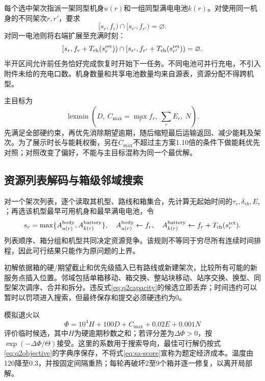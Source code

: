 \documentclass[a4paper]{my_paper}%
\numberwithin{equation}{section}
\newcommand{\lexmin}{\operatorname{lexmin}}
\theoremstyle{definition}
\begin{document}
每个选中架次指派一架同型机身$u(r)$和一组同型满电电池$k(r)$。对使用同一机身的不同架次$r,r'$，要求
\begin{equation}
 [s_r,f_r)\cap[s_{r'},f_{r'})=\varnothing.
 \label{eq:airbody}
\end{equation}
对同一电池则将右端扩展至充满时刻：
\begin{equation}
 [s_r,f_r+T_{\rm ch}(s_r^{\rm ret}))\cap
 [s_{r'},f_{r'}+T_{\rm ch}(s_{r'}^{\rm ret}))=\varnothing.
 \label{eq:battery}
\end{equation}
半开区间允许前任务恰好完成恢复时开始下一任务。不同电池可并行充电，不引入附件未给的充电口数。机身数量和共享电池数量均来自源表，资源分配不得跨机型。

主目标为
\begin{equation}
 \lexmin\left(D,\ C_{\max}=\max_r f_r,\ \sum_rE_r,\ N\right).
 \label{eq:q2objective}
\end{equation}
先满足全部硬约束，再优先消除期望逾期，随后缩短最后运输返回、减少能耗及架次。为了展示时长与能耗权衡，另在$C_{\max}$不超过主方案1.10倍的条件下做能耗优先对照；对照改变了偏好，不能与主目标混称为同一个最优解。

\subsection{资源列表解码与箱级邻域搜索}
对一个架次列表，逐个读取其机型、路线和箱集合，先计算无起始时间的$\tau_r,\delta_{rb},E_r$；再选该机型最早可用机身和最早满电电池，令
\begin{equation}
 s_r=\max\{A^{\rm body}_{u(r)},A^{\rm battery}_{k(r)}\},\quad
 A^{\rm body}_{u(r)}\leftarrow f_r,\quad
 A^{\rm battery}_{k(r)}\leftarrow f_r+T_{\rm ch}(s_r^{\rm ret}).
 \label{eq:listdecode}
\end{equation}
列表顺序、箱分组和机型共同决定资源竞争。该规则不等同于穷尽所有连续时间排程，因此可行结果只能作为原问题的上界。

初解依据箱的硬/期望截止和优先级插入已有路线或新建架次，比较所有可能的新服务点插入位置。邻域包括单箱移动、箱交换、整站块移动、站序交换、换型、同型架次调序、合并和拆分。违反式\eqref{eq:q2capacity}的候选立即丢弃；时间违约可以暂时以罚项进入搜索，但最终保存和提交必须硬违约为0。

模拟退火以
\begin{equation}
 \Phi=10^4H+100D+C_{\max}+0.02E+0.001N
 \label{eq:sa-score}
\end{equation}
评价临时候选，其中$H$为硬逾期秒数之和；若评分差为$\Delta\Phi>0$，按$\exp(-\Delta\Phi/\Theta)$接受。这里的系数用于搜索导向，最佳可行解仍按式\eqref{eq:q2objective}的字典序保存，不将式\eqref{eq:sa-score}宣称为题定经济成本。温度由120降至0.3，并按固定间隔重热；每轮再破坏2至9个箱并逐一修复，以离开局部解。
\end{document}
